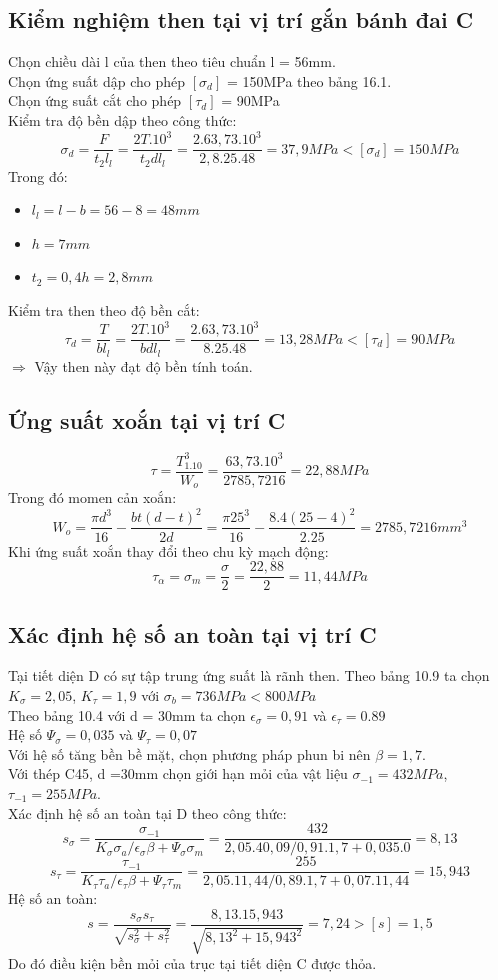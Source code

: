 \subsection{Kiểm nghiệm then tại vị trí gắn bánh đai C}
Chọn chiều dài l của then theo tiêu chuẩn l = 56mm.\\
Chọn ứng suất dập cho phép $[\sigma_d]$ = 150MPa theo bảng 16.1. \\
Chọn ứng suất cắt cho phép $[\tau_d]$ = 90MPa \\
Kiểm tra độ bền dập theo công thức:
\[
    \sigma_d = \frac{F}{t_2l_l} = \frac{2T.10^3}{t_2dl_l} = \frac{2.63,73.10^3}{2,8.25.48} = 37,9MPa < [\sigma_d] = 150MPa
\]
Trong đó:
\begin{itemize}
    \item $l_l = l - b = 56 - 8 = 48mm$
    \item $h = 7mm$
    \item $t_2 = 0,4h = 2,8mm$
\end{itemize}
Kiểm tra then theo độ bền cắt: 
\[
    \tau_d = \frac{T}{bl_l} = \frac{2T.10^3}{bdl_l} = \frac{2.63,73.10^3}{8.25.48} = 13,28MPa < [\tau_d] = 90MPa 
\]
$\Rightarrow$ Vậy then này đạt độ bền tính toán.
\subsection{Ứng suất xoắn tại vị trí C}
\[
    \tau = \frac{T_1.10^3}{W_o} = \frac{63,73.10^3}{2785,7216} = 22,88MPa
\]
Trong đó momen cản xoắn:
\[
    W_o = \frac{\pi d^3}{16} - \frac{bt(d-t)^2}{2d} = \frac{\pi 25^3}{16} - \frac{8.4(25-4)^2}{2.25} = 2785,7216mm^3
\]
Khi ứng suất xoắn thay đổi theo chu kỳ mạch động: 
\[
    \tau_\alpha = \sigma_m = \frac{\sigma}{2} = \frac{22,88}{2} = 11,44MPa
\]
\subsection{Xác định hệ số an toàn tại vị trí C}
Tại tiết diện D có sự tập trung ứng suất là rãnh then. Theo bảng 10.9 ta chọn $K_\sigma =2,05$, $K_\tau = 1,9$ với $\sigma_b = 736MPa < 800MPa$ \\
Theo bảng 10.4 với d = 30mm ta chọn $\epsilon_\sigma = 0,91$ và $\epsilon_\tau = 0.89$ \\
Hệ số $\Psi_\sigma = 0,035$ và $\Psi_\tau = 0,07$ \\ 
Với hệ số tăng bền bề mặt, chọn phương pháp phun bi nên $\beta = 1,7$. \\
Với thép C45, d =30mm chọn giới hạn mỏi của vật liệu $\sigma_{-1} = 432MPa$, $\tau_{-1} = 255MPa$. \\
Xác định hệ số an toàn tại D theo công thức:
\[
    s_\sigma = \frac{\sigma_{-1}}{K_\sigma \sigma_a / \epsilon_\sigma \beta + \Psi_\sigma \sigma_m} = \frac{432}{2,05.40,09/0,91.1,7 + 0,035.0} = 8,13
\]
\[
    s_\tau = \frac{\tau_{-1}}{K_\tau \tau_a / \epsilon_\tau \beta + \Psi_\tau \tau_m} = \frac{255}{2,05.11,44/0,89.1,7 + 0,07.11,44} = 15,943
\]
Hệ số an toàn:
\[
    s = \frac{s_\sigma s_\tau}{\sqrt{s_\sigma^2 + s_\tau^2}} = \frac{8,13.15,943}{\sqrt{8,13^2 + 15,943^2}} = 7,24 > [s] = 1,5
\]
Do đó điều kiện bền mỏi của trục tại tiết diện C được thỏa.